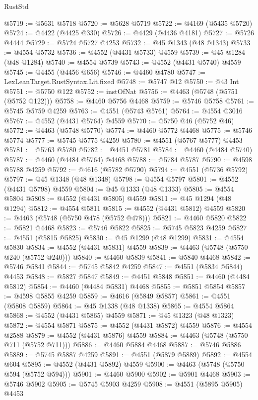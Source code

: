 \begin{lexlean}{RustStd}
\begin{coremodule}
@5719 := @5631 @5718
@5720 := @5628 @5719
@5722 := @4169 (@5435 @5720)
@5724 := @4422 (@4425 @330)
@5726 := @4429 (@4436 @4181)
@5727 := @5726 @4444
@5729 := @5724 @5727 @4253
@5732 := @45 @1343 (@48 @1343)
@5733 := @4554 @5732
@5736 := @4552 (@4431 @5733) @4559
@5739 := @45 @1284 (@48 @1284)
@5740 := @4554 @5739
@5743 := @4552 (@4431 @5740) @4559
@5745 := @4455 (@4456 @656)
@5746 := @4460 @4780
@5747 := LexLeanTarget.RustSyntax.Lit.fixed
@5748 := @5747 @12
@5750 := @43 Int
@5751 := @5750 @122
@5752 := instOfNat
@5756 := @4463 (@5748 (@5751 (@5752 @122)))
@5758 := @4460 @5756 @4468
@5759 := @5746 @5758
@5761 := @5745 @5759 @4259
@5763 := @4551 (@5743 @5761)
@5764 := @4554 @3016
@5767 := @4552 (@4431 @5764) @4559
@5770 := @5750 @46 (@5752 @46)
@5772 := @4463 (@5748 @5770)
@5774 := @4460 @5772 @4468
@5775 := @5746 @5774
@5777 := @5745 @5775 @4259
@5780 := @4551 (@5767 @5777) @4453
@5781 := @5763 @5780
@5782 := @4451 @5781
@5784 := @4460 (@4484 @5740)
@5787 := @4460 (@4484 @5764) @4468
@5788 := @5784 @5787
@5790 := @4598 @5788 @4259
@5792 := @4616 (@5782 @5790)
@5794 := @4551 (@5736 @5792)
@5797 := @45 @1348 (@48 @1348)
@5798 := @4554 @5797
@5801 := @4552 (@4431 @5798) @4559
@5804 := @45 @1333 (@48 @1333)
@5805 := @4554 @5804
@5808 := @4552 (@4431 @5805) @4559
@5811 := @45 @1294 (@48 @1294)
@5812 := @4554 @5811
@5815 := @4552 (@4431 @5812) @4559
@5820 := @4463 (@5748 (@5750 @478 (@5752 @478)))
@5821 := @4460 @5820
@5822 := @5821 @4468
@5823 := @5746 @5822
@5825 := @5745 @5823 @4259
@5827 := @4551 (@5815 @5825)
@5830 := @45 @1299 (@48 @1299)
@5831 := @4554 @5830
@5834 := @4552 (@4431 @5831) @4559
@5839 := @4463 (@5748 (@5750 @240 (@5752 @240)))
@5840 := @4460 @5839
@5841 := @5840 @4468
@5842 := @5746 @5841
@5844 := @5745 @5842 @4259
@5847 := @4551 (@5834 @5844) @4453
@5848 := @5827 @5847
@5849 := @4451 @5848
@5851 := @4460 (@4484 @5812)
@5854 := @4460 (@4484 @5831) @4468
@5855 := @5851 @5854
@5857 := @4598 @5855 @4259
@5859 := @4616 (@5849 @5857)
@5861 := @4551 (@5808 @5859)
@5864 := @45 @1338 (@48 @1338)
@5865 := @4554 @5864
@5868 := @4552 (@4431 @5865) @4559
@5871 := @45 @1323 (@48 @1323)
@5872 := @4554 @5871
@5875 := @4552 (@4431 @5872) @4559
@5876 := @4554 @2588
@5879 := @4552 (@4431 @5876) @4559
@5884 := @4463 (@5748 (@5750 @711 (@5752 @711)))
@5886 := @4460 @5884 @4468
@5887 := @5746 @5886
@5889 := @5745 @5887 @4259
@5891 := @4551 (@5879 @5889)
@5892 := @4554 @604
@5895 := @4552 (@4431 @5892) @4559
@5900 := @4463 (@5748 (@5750 @594 (@5752 @594)))
@5901 := @4460 @5900
@5902 := @5901 @4468
@5903 := @5746 @5902
@5905 := @5745 @5903 @4259
@5908 := @4551 (@5895 @5905) @4453

\end{coremodule}
\end{lexlean}
